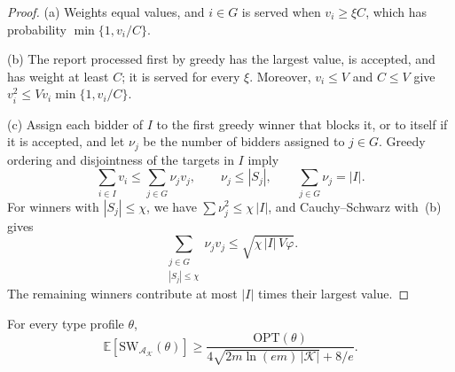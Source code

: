 \documentclass[format=acmsmall, review=false]{acmart}
\newcommand{\E}{\mathbb{E}}
\newcommand{\OPT}{\mathrm{OPT}}
\newcommand{\SW}{\mathrm{SW}}
\begin{document}
\begin{proof}
(a) Weights equal values, and \(i\in G\) is served when
\(v_i\ge\xi C\), which has probability \(\min\{1,v_i/C\}\).

(b) The report processed first by greedy has the largest value,
is accepted, and has weight at least \(C\); it is served for
every \(\xi\). Moreover, \(v_i\le V\) and \(C\le V\) give
\(v_i^2\le Vv_i\min\{1,v_i/C\}\).

(c) Assign each bidder of \(I\) to the first greedy winner that
blocks it, or to itself if it is accepted, and let \(\nu_j\) be
the number of bidders assigned to \(j\in G\). Greedy ordering
and disjointness of the targets in \(I\) imply
\[
\sum_{i\in I}v_i\le\sum_{j\in G}\nu_jv_j,
\qquad
\nu_j\le|S_j|,
\qquad
\sum_{j\in G}\nu_j=|I|.
\]
For winners with \(|S_j|\le\chi\), we have
\(\sum\nu_j^2\le\chi\,|I|\), and Cauchy--Schwarz with~(b) gives
\[
\sum_{\substack{j\in G\\|S_j|\le\chi}}\nu_jv_j
\le\sqrt{\chi\,|I|\,V\varphi}.
\]
The remaining winners contribute at most \(|I|\) times their
largest value.
\end{proof}

\begin{proposition}
\label{prop:welfare}
For every type profile \(\theta\),
\[
\E[\SW_{\mathcal A_{\mathcal K}}(\theta)]
\ge
\frac{\OPT(\theta)}{
4\sqrt{2m\ln(em)\,|\mathcal K|}+8/e}.
\]
\end{proposition}
\end{document}
